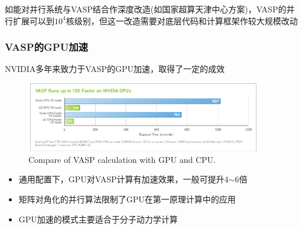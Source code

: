 {{如能对并行系统与\textrm{VASP}结合作深度改造(如国家超算天津中心方案)，\textrm{VASP}的并行扩展可以到$10^4$核级别，但这一改造需要对底层代码和计算框架作较大规模改动
}

\frame
{
	\frametitle{\textrm{VASP}的\textrm{GPU}加速}
\textrm{NVIDIA}多年来致力于\textrm{VASP}的\textrm{GPU}加速，取得了一定的成效
\begin{figure}[h!]
	\vspace{-0.15in}
\centering
\includegraphics[height=1.2in,width=4.05in,viewport=0 0 850 260,clip]{Figures/VASP-GPU-CPU.png}
\caption{\tiny \textrm{Compare of VASP calculation with GPU and CPU.}}%
\label{VASP_GPU}
\end{figure} 
\begin{itemize}
	\item 通用配置下，\textrm{GPU}对\textrm{VASP}计算有加速效果，一般可提升4$\sim$6倍
	\item 矩阵对角化的并行算法限制了\textrm{GPU}在第一原理计算中的应用
	\item \textrm{GPU}加速的模式主要适合于分子动力学计算
\end{itemize}
}

}
